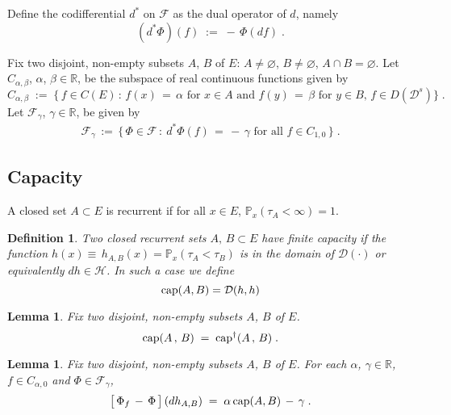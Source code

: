 \documentclass[reqno]{amsart}
\newtheorem{lemma}[theorem]{Lemma}
\newtheorem{definition}[theorem]{Definition}
\newcounter{as}[section]
\newcommand{\mc}[1]{{\mathcal #1}}
\newcommand{\bb}[1]{{\mathbb #1}}
\newcommand{\ms}[1]{{\mathscr #1}}
\newcommand{\<}{\langle}
\renewcommand{\>}{\rangle}
\renewcommand{\Cap}{{\rm cap}}
\newcommand{\bel}[2]{\begin{equation} \label{#1} \begin{split} #2
 					\end{split} \end{equation}}
\begin{document}
Define the codifferential $d^\ast$ on $\ms F$ as the dual operator of
$d$, namely
\begin{equation*}
(d^\ast \Phi)(f) \;:=\; - \, \Phi(df)\;.
\end{equation*}

Fix two disjoint, non-empty subsets $A$, $B$ of $E$: $A\not =
\varnothing$, $B\not = \varnothing$, $A \cap B = \varnothing$.  Let
$C_{\alpha,\beta}$, $\alpha$, $\beta\in \bb R$, be the subspace of
real continuous functions given by
\begin{equation*}
C_{\alpha,\beta} \;:=\; \big\{ \, f\in C(E)  \,:\,
f(x) \,=\, \alpha \text{ for $x\in A$ and } f(y)\,=\, \beta \text{ for
  $y\in B$}, \, f\in D(\mathcal{D}^s) \big\}\;.
\end{equation*}
Let $\ms F_\gamma$, $\gamma\in \bb R$, be given by
\bel{fgamma}{
\ms F_\gamma \,:=\, 
\big\{\, \Phi \in \ms F\,:\: d^\ast \Phi(f) \,=\, -\, \gamma 
\text{ for all $f\in C_{1,0}$} \,\big \}\;.
}


\subsection{Capacity}
A closed set $A\subset E$ is recurrent if for all $x\in E$, $\bb
P_x(\tau_A<\infty)=1$. 

\begin{definition}
\label{def1}
Two closed recurrent sets $A,\,B\subset E$ have \emph{finite capacity}
if the function $h(x)\equiv\,h_{A,B}(x)=\bb P_x(\tau_A<\tau_B)$ is in
the domain of $\mc D(\cdot)$ or equivalently $dh\in \ms H$. In such a
case we define
\begin{equation}
\label{08}
\Cap(A,B)=\mc D(h,h)
\end{equation}
\end{definition}

\begin{lemma}
\label{l02}
Fix two disjoint, non-empty subsets $A$, $B$ of $E$.  
\begin{equation*}
\Cap (A \,,\, B) \;=\; \Cap^\dagger (A \,,\, B) \;.
\end{equation*}
\end{lemma}

\begin{lemma}
\label{l01}
Fix two disjoint, non-empty subsets $A$, $B$ of $E$.  For each
$\alpha$, $\gamma\in \bb R$, $f\in C_{\alpha,0}$ and $\Phi\in \ms
F_\gamma$,
\begin{equation}
\label{04}
\big[\, \Phi_f \,-\, \Phi\, \big] \, (dh_{A,B})
\;=\; \alpha \, \Cap(A,B) \,-\, \gamma \;.
\end{equation}
\end{lemma}
\end{document}
